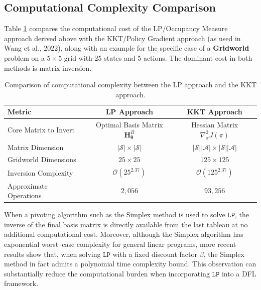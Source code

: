\subsection{Computational Complexity Comparison}
Table \ref{tbl:1} compares the computational cost of the LP/Occupancy Measure approach derived above with the KKT/Policy Gradient approach (as used in Wang et al., 2022), along with an example for the specific case of a \textbf{Gridworld} problem on a $5 \times 5$ grid with 25 states and 5 actions. The dominant cost in both methods is matrix inversion.
\begin{table}[ht!]
    \centering
    \caption{\small{Comparison of computational complexity between the LP  approach and the KKT approach.}} 
    \vspace*{0.5em}
    \label{tbl:1}
    
    \begin{tabular}{l|c|c}
        \textbf{Metric} &
        \textbf{LP Approach} &
        \textbf{KKT Approach} \\[0.1em] \hline 
        Core Matrix to Invert &
        Optimal Basis Matrix $\bm{H}_{\bm{\theta}}^B$ &
        Hessian Matrix $\nabla_{\pi}^2 J(\pi)$ \\[0.1em]
        Matrix Dimension &
        $|\mathcal{S}| \times |\mathcal{S}|$ &
        $|\mathcal{S}||\mathcal{A}| \times |\mathcal{S}||\mathcal{A}|$ \\[0.1em]
        Gridworld Dimensions &
        $25 \times 25$ &
        $125 \times 125$ \\[0.1em]
        Inversion Complexity &
        $\mathcal{O}(25^{2.37})$ &
        $\mathcal{O}(125^{2.37})$ \\[0.1em]
        Approximate Operations &
        $2{,}056$ &
        $93{,}256$
    \end{tabular}
\end{table}

\begin{remark}
    When a pivoting algorithm such as the Simplex method is used to solve $\mathtt{LP}$, the inverse of the final basis matrix is directly available from the last tableau at no additional computational cost. Moreover, although the Simplex algorithm has exponential worst--case complexity for general linear programs, more recent results show that, when solving $\mathtt{LP}$ with a fixed discount factor $\beta$, the Simplex method in fact admits a polynomial time complexity bound. This observation can substantially reduce the computational burden when incorporating $\mathtt{LP}$ into a DFL framework.
\end{remark}


